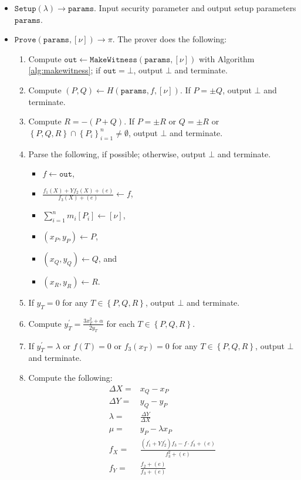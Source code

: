 \documentclass[11pt,letterpaper]{article}
\theoremstyle{definition}
\newcommand{\6}{\mathbf}
\newcommand{\7}{\mathcal}
\begin{document}
\begin{itemize}
\item $\texttt{Setup}(\lambda) \to \texttt{params}$. Input security parameter and output setup parameters $\texttt{params}$.
\item $\texttt{Prove}(\texttt{params}, [\nu]) \to \pi$. The prover does the following:
\begin{enumerate}
\item Compute $\texttt{out} \leftarrow \texttt{MakeWitness}(\texttt{params}, [\nu])$ with Algorithm \ref{alg:makewitness}; if $\texttt{out} = \bot$, output $\bot$ and terminate.
\item Compute $(P, Q) \leftarrow H(\texttt{params}, f, [\nu])$. If $P = \pm Q$, output $\bot$ and terminate.
\item Compute $R = -(P + Q)$. If $P = \pm R$ or $Q = \pm R$ or $\left\{P, Q, R\right\} \cap \left\{P_i\right\}_{i=1}^{n} \neq \emptyset$, output $\bot$ and terminate. %
\item Parse the following, if possible; otherwise, output $\bot$ and terminate.
\begin{itemize}
\item $f \leftarrow \texttt{out}$,
\item $\frac{f_1(X) + Yf_2(X) + (e)}{f_3(X) + (e)} \leftarrow f$,
\item $\sum_{i=1}^{n} m_i [P_i] \leftarrow [\nu]$,
\item $(x_P, y_P) \leftarrow P$,
\item $(x_Q, y_Q) \leftarrow Q$, and
\item $(x_R, y_R) \leftarrow R$.
\end{itemize}
\item If $y_T = 0$ for any $T \in \left\{P,Q,R\right\}$, output $\bot$ and terminate.
\item Compute $y_T^\prime = \frac{3x_T^2+\alpha}{2y_T}$ for each $T \in \left\{P, Q, R\right\}$.
\item If $y_T^\prime = \lambda$  or $f(T) = 0$ or $f_3(x_T) = 0$ for any $T \in \left\{P, Q, R\right\}$, output $\bot$ and terminate.


\item \label{repeatstep} Compute the following:
\begin{align}
\Delta X =& x_Q - x_P\\
\Delta Y =& y_Q - y_P\\
\lambda =& \frac{\Delta Y}{\Delta X} \\
\mu =& y_P - \lambda x_P \\
f_X =& \frac{(f_1^\prime + Yf_2^\prime)f_3 - f\cdot f_3^\prime + (e)}{f_3^2 + (e)}\\
f_Y =& \frac{f_2 + (e)}{f_3 + (e)}
\end{align}


\end{enumerate}
\end{itemize}
\end{document}
